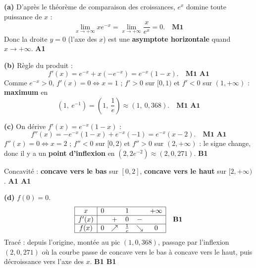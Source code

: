 \documentclass[11pt]{article}
\newcommand{\legende}[1]{\par\vspace{6pt}{\popsemi\fontsize{9}{11.5}\selectfont\color{popmuted}#1}}
\begin{document}
\begin{corrige}
\textbf{(a)} D'après le théorème de comparaison des croissances, $e^x$ domine toute puissance de $x$ :
\[
\lim_{x \to +\infty} x e^{-x} = \lim_{x \to +\infty} \frac{x}{e^x} = 0. \quad \textbf{M1}
\]
Donc la droite $y = 0$ (l'axe des $x$) est une \textbf{asymptote horizontale} quand $x \to +\infty$. \hfill \textbf{A1}

\textbf{(b)} Règle du produit :
\[
f'(x) = e^{-x} + x(-e^{-x}) = e^{-x}(1 - x). \quad \textbf{M1 A1}
\]
Comme $e^{-x} > 0$, $f'(x) = 0 \iff x = 1$ ; $f' > 0$ sur $[0, 1)$ et $f' < 0$ sur $(1, +\infty)$ : \textbf{maximum} en
\[
\left(1,\ e^{-1}\right) = \left(1,\ \frac{1}{e}\right) \approx (1,\ 0,368). \quad \textbf{M1 A1}
\]

\textbf{(c)} On dérive $f'(x) = e^{-x}(1-x)$ :
\[
f''(x) = -e^{-x}(1-x) + e^{-x}(-1) = e^{-x}(x - 2). \quad \textbf{M1 A1}
\]
$f''(x) = 0 \iff x = 2$ ; $f'' < 0$ sur $[0, 2)$ et $f'' > 0$ sur $(2, +\infty)$ : le signe change, donc il y a un \textbf{point d'inflexion} en $\left(2, 2e^{-2}\right) \approx (2, 0,271)$. \hfill \textbf{B1}

Concavité : \textbf{concave vers le bas} sur $[0, 2]$, \textbf{concave vers le haut} sur $[2, +\infty)$. \hfill \textbf{A1 A1}

\textbf{(d)} $f(0) = 0$.
\[
\begin{array}{|c|ccccc|}
\hline
x & 0 & & 1 & & +\infty \\
\hline
f'(x) & & + & 0 & - & \\
\hline
f(x) & 0 & \nearrow & \frac{1}{e} & \searrow & 0 \\
\hline
\end{array} \quad \textbf{B1}
\]
Tracé : depuis l'origine, montée au pic $(1, 0,368)$, passage par l'inflexion $(2, 0,271)$ où la courbe passe de concave vers le bas à concave vers le haut, puis décroissance vers l'axe des $x$. \hfill \textbf{B1 B1}

\begin{popfigure}
\begin{center}
\end{center}
\legende{Courbe de $f(x) = x e^{-x}$ (échelle réelle).}
\end{popfigure}


\end{corrige}
\end{document}
